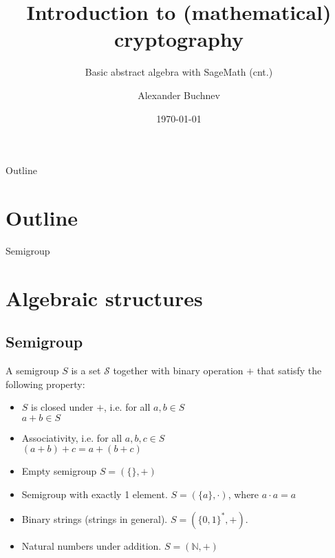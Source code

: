 \documentclass{beamer}
\title{Introduction to (mathematical) cryptography}
\subtitle{Basic abstract algebra with SageMath (cnt.)}
\author{Alexander Buchnev}
\date{\monthYear\today}
\begin{document}
\frame{
	\titlepage
}

\newtheorem{prop}{Proposition}


\begin{frame}{Outline}
    \section{Outline}
	\tableofcontents
\end{frame}

\begin{frame}{Semigroup}
    \section{Algebraic structures}
	\subsection{Semigroup}
	\begin{definition}
		A semigroup $S$ is a set $\mathcal{S}$ together with binary operation $+$ that satisfy the following property:
		\begin{itemize}
			\item $S$ is closed under $+$, i.e. for all $a, b \in S$ \\
				$a + b \in S$
			\item Associativity, i.e. for all $a, b, c \in S$ \\
				$(a + b) + c = a + (b + c)$
		\end{itemize} 
	\end{definition}

	\begin{example}
		\begin{itemize}
			\item Empty semigroup $S = (\{\}, +)$
			\item Semigroup with exactly 1 element. $S = (\{a\}, \cdot)$, where $a \cdot a = a$
			\item Binary strings (strings in general). $S = (\{0, 1\}^*, +)$.
			\item Natural numbers under addition. $S = (\mathbb{N}, +)$
		\end{itemize}
	\end{example}
\end{frame}
\end{document}
